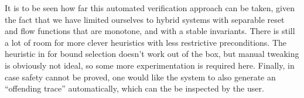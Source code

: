 \documentclass[runningheads]{llncs}
\begin{document}
It is to be seen how far this automated verification approach can be
taken, given the fact that we have limited ourselves to hybrid systems
with separable reset and flow functions that are monotone, and with a
stable invariants. There is still a lot of room for more clever
heuristics with less restrictive preconditions. The heuristic in
\cite{alur} for bound selection doesn't work out of the box, but
manual tweaking is obviously not ideal, so some more experimentation
is required here. Finally, in case safety cannot be proved, one would
like the system to also generate an ``offending trace'' automatically,
which can the be inspected by the user.



\end{document}
